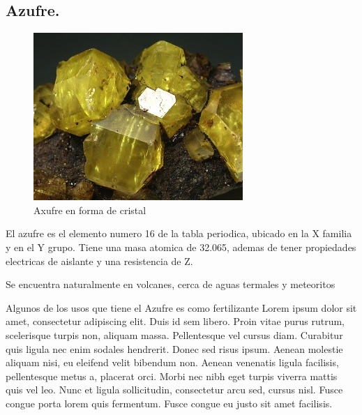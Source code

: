 \documentclass[letter]{article}
\begin{document}
    \subsection{Azufre.}
        \begin{figure}
            \includegraphics[width=1\linewidth]{azufre} 
            \caption{Axufre en forma de cristal}
            \label{fig:subim1}
        \end{figure}
        El azufre es el elemento numero 16 de la tabla periodica, ubicado en la X familia y en el Y grupo. Tiene una masa atomica de 32.065, ademas de tener propiedades electricas de aislante y una resistencia de Z.\par
        Se encuentra naturalmente en volcanes, cerca de aguas termales y meteoritos \par
        Algunos de los usos que tiene el Azufre es como fertilizante \cite{acuna1991fertilizacion}
        Lorem ipsum dolor sit amet, consectetur adipiscing elit. Duis id sem libero. Proin vitae purus rutrum, scelerisque turpis non, aliquam massa. Pellentesque vel cursus diam. Curabitur quis ligula nec enim sodales hendrerit. Donec sed risus ipsum. Aenean molestie aliquam nisi, eu eleifend velit bibendum non. Aenean venenatis ligula facilisis, pellentesque metus a, placerat orci. Morbi nec nibh eget turpis viverra mattis quis vel leo. Nunc et ligula sollicitudin, consectetur arcu sed, cursus nisl. Fusce congue porta lorem quis fermentum. Fusce congue eu justo sit amet facilisis.\par
\end{document}
